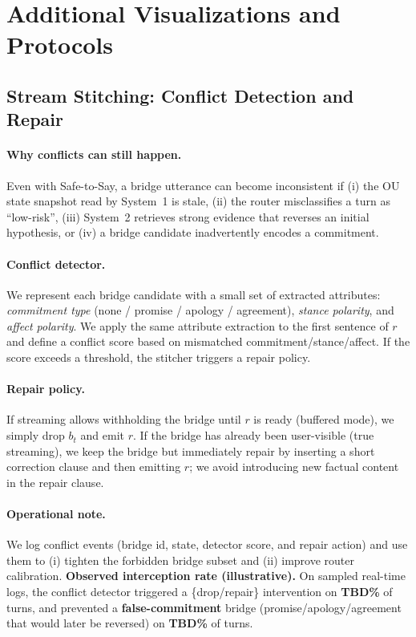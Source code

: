 \documentclass{article}
\begin{document}
\section{Additional Visualizations and Protocols}
\label{app:visuals}

\subsection{Stream Stitching: Conflict Detection and Repair}
\label{app:stitching-conflicts}
\paragraph{Why conflicts can still happen.}
Even with Safe-to-Say, a bridge utterance can become inconsistent if (i) the OU state snapshot read by System~1 is stale, (ii) the router misclassifies a turn as ``low-risk'', (iii) System~2 retrieves strong evidence that reverses an initial hypothesis, or (iv) a bridge candidate inadvertently encodes a commitment.

\paragraph{Conflict detector.}
We represent each bridge candidate with a small set of extracted attributes: \textit{commitment type} (none / promise / apology / agreement), \textit{stance polarity}, and \textit{affect polarity}. We apply the same attribute extraction to the first sentence of $r$ and define a conflict score based on mismatched commitment/stance/affect.
If the score exceeds a threshold, the stitcher triggers a repair policy.

\paragraph{Repair policy.}
If streaming allows withholding the bridge until $r$ is ready (buffered mode), we simply drop $b_t$ and emit $r$.
If the bridge has already been user-visible (true streaming), we keep the bridge but immediately repair by inserting a short correction clause and then emitting $r$; we avoid introducing new factual content in the repair clause.

\paragraph{Operational note.}
We log conflict events (bridge id, state, detector score, and repair action) and use them to (i) tighten the forbidden bridge subset and (ii) improve router calibration.
\textbf{Observed interception rate (illustrative).} On sampled real-time logs, the conflict detector triggered a \{drop/repair\} intervention on \textbf{TBD\%} of turns, and prevented a \textbf{false-commitment} bridge (promise/apology/agreement that would later be reversed) on \textbf{TBD\%} of turns.
\end{document}
